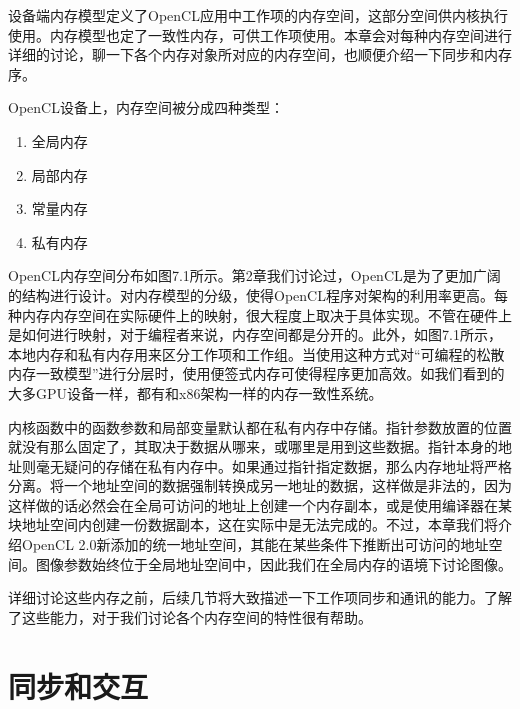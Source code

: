 
设备端内存模型定义了OpenCL应用中工作项的内存空间，这部分空间供内核执行使用。内存模型也定了一致性内存，可供工作项使用。本章会对每种内存空间进行详细的讨论，聊一下各个内存对象所对应的内存空间，也顺便介绍一下同步和内存序。

OpenCL设备上，内存空间被分成四种类型：

\begin{enumerate}
\item 全局内存
\item 局部内存
\item 常量内存
\item 私有内存
\end{enumerate}

OpenCL内存空间分布如图7.1所示。第2章我们讨论过，OpenCL是为了更加广阔的结构进行设计。对内存模型的分级，使得OpenCL程序对架构的利用率更高。每种内存内存空间在实际硬件上的映射，很大程度上取决于具体实现。不管在硬件上是如何进行映射，对于编程者来说，内存空间都是分开的。此外，如图7.1所示，本地内存和私有内存用来区分工作项和工作组。当使用这种方式对“可编程的松散内存一致模型”进行分层时，使用便签式内存可使得程序更加高效。如我们看到的大多GPU设备一样，都有和x86架构一样的内存一致性系统。


内核函数中的函数参数和局部变量默认都在私有内存中存储。指针参数放置的位置就没有那么固定了，其取决于数据从哪来，或哪里是用到这些数据。指针本身的地址则毫无疑问的存储在私有内存中。如果通过指针指定数据，那么内存地址将严格分离。将一个地址空间的数据强制转换成另一地址的数据，这样做是非法的，因为这样做的话必然会在全局可访问的地址上创建一个内存副本，或是使用编译器在某块地址空间内创建一份数据副本，这在实际中是无法完成的。不过，本章我们将介绍OpenCL 2.0新添加的统一地址空间，其能在某些条件下推断出可访问的地址空间。图像参数始终位于全局地址空间中，因此我们在全局内存的语境下讨论图像。

详细讨论这些内存之前，后续几节将大致描述一下工作项同步和通讯的能力。了解了这些能力，对于我们讨论各个内存空间的特性很有帮助。


\section{同步和交互}

